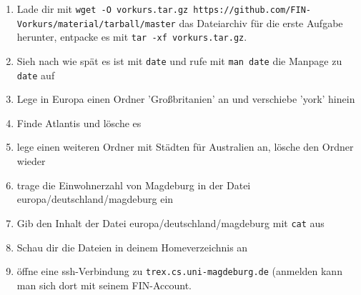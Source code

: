 \begin{enumerate}
\item Lade dir mit \lstinline$wget -O vorkurs.tar.gz https://github.com/FIN-Vorkurs/material/tarball/master$ das Dateiarchiv für die erste Aufgabe herunter, entpacke es mit \lstinline$tar -xf vorkurs.tar.gz$.
\item Sieh nach wie spät es ist mit \lstinline$date$ und rufe mit \lstinline$man date$ die Manpage zu \lstinline$date$ auf
\item Lege in Europa einen Ordner 'Großbritanien' an und verschiebe 'york' hinein
\item Finde Atlantis und lösche es
\item lege einen weiteren Ordner mit Städten für Australien an, lösche den Ordner wieder
\item trage die Einwohnerzahl von Magdeburg in der Datei europa/deutschland/magdeburg ein
\item Gib den Inhalt der Datei europa/deutschland/magdeburg mit \lstinline$cat$ aus
\item Schau dir die Dateien in deinem Homeverzeichnis an
\item öffne eine ssh-Verbindung zu \lstinline$trex.cs.uni-magdeburg.de$ (anmelden kann man sich dort mit seinem FIN-Account.
\end{enumerate}
